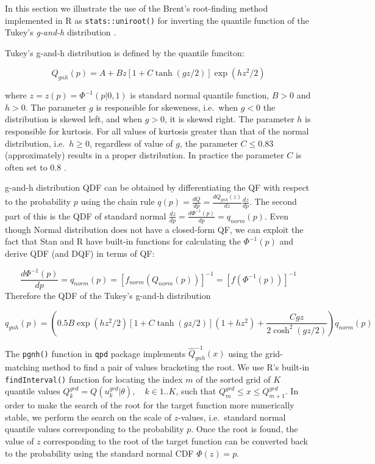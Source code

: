 \documentclass[
  12pt,
]{article}
\begin{document}
In this section we illustrate the use of the Brent's root-finding method implemented in R as \texttt{stats::uniroot()} for inverting the quantile function of the Tukey's \emph{g-and-h} distribution \citep{rayner2002NumericalMaximumLikelihood}.

Tukey's g-and-h distribution is defined by the quantile funciton:

\[
Q_{gnh}(p)=A+Bz[1+C\tanh(gz/2)]\exp(hz^2/2)
\]

where \(z=z(p)=\Phi^{-1}(p|0,1)\) is standard normal quantile function, \(B>0\) and \(h>0\). The parameter \(g\) is responsible for skeweness, i.e.~when \(g<0\) the distribution is skewed left, and when \(g>0\), it is skewed right. The parameter \(h\) is responsible for kurtosis. For all values of kurtosis greater than that of the normal distribution, i.e.~\(h\geq 0\), regardless of value of \(g\), the parameter \(C \leq 0.83\) (approximately) results in a proper distribution. In practice the parameter \(C\) is often set to 0.8 \citep{prangle2017GkPackageGandk}.

g-and-h distribution QDF can be obtained by differentiating the QF with respect to the probability \(p\) using the chain rule \(q(p)=\frac{dQ}{dp}=\frac{dQ_{gnh}(z)}{dz}\frac{dz}{dp}\). The second part of this is the QDF of standard normal \(\frac{dz}{dp}=\frac{d\Phi^{-1}(p)}{dp}=q_{norm}(p)\). Even though Normal distribution does not have a closed-form QF, we can exploit the fact that Stan and R have built-in functions for calculating the \(\Phi^{-1}(p)\) and derive QDF (and DQF) in terms of QF:

\[\frac{d\Phi^{-1}(p)}{dp}=q_{norm}(p)=[f_{norm}(Q_{norm}(p))]^{-1}=[f(\Phi^{-1}(p))]^{-1}\]
Therefore the QDF of the Tukey's g-and-h distribution

\[
q_{gnh}(p)=\left(0.5B\exp(hz^2/2)[1+C\tanh(gz/2)](1+hz^2)+ \frac{Cgz}{2\cosh^2(gz/2)}\right)q_{norm}(p)
\]

The \texttt{pgnh()} function in \texttt{qpd} package \citep{perepolkin2019QpdToolsQuantileparameterized} implements \(\widehat{Q}^{-1}_{gnh}(x)\) using the grid-matching method to find a pair of values bracketing the root. We use R's built-in \texttt{findInterval()} function for locating the index \(m\) of the sorted grid of \(K\) quantile values \(Q^{grd}_k=Q(u^{grd}_k|\theta), \quad k \in 1..K\), such that \(Q^{grd}_{m} \leq x \leq Q^{grd}_{m+1}\). In order to make the search of the root for the target function more numerically stable, we perform the search on the scale of \(z\)-values, i.e.~standard normal quantile values corresponding to the probability \(p\). Once the root is found, the value of \(z\) corresponding to the root of the target function can be converted back to the probability using the standard normal CDF \(\Phi(z)=p\).
\end{document}
